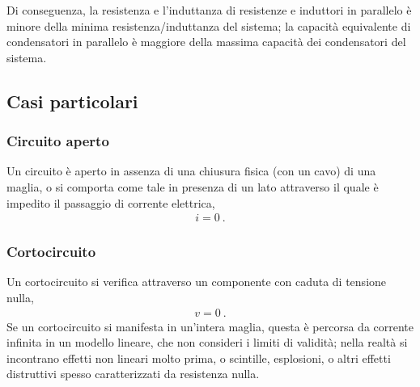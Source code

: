 \documentclass[letterpaper,10pt,italian]{jupyterBook}
\begin{document}
\sphinxAtStartPar
Di conseguenza, la resistenza e l’induttanza di resistenze e induttori in parallelo è minore della minima resistenza/induttanza del sistema; la capacità equivalente di condensatori in parallelo è maggiore della massima capacità dei condensatori del sistema.


\subsection{Casi particolari}
\label{\detokenize{ch/electromagnetism/circuits-electric:casi-particolari}}\label{\detokenize{ch/electromagnetism/circuits-electric:physics-hs-electromagnetism-circuits-electric-circuits}}

\subsubsection{Circuito aperto}
\label{\detokenize{ch/electromagnetism/circuits-electric:circuito-aperto}}\label{\detokenize{ch/electromagnetism/circuits-electric:physics-hs-electromagnetism-circuits-electric-circuits-open}}
\sphinxAtStartPar
Un circuito è aperto in assenza di una chiusura fisica (con un cavo) di una maglia, o si comporta come tale in presenza di un lato attraverso il quale è impedito il passaggio di corrente elettrica,
\begin{equation*}
\begin{split}i = 0 \ .\end{split}
\end{equation*}

\subsubsection{Cortocircuito}
\label{\detokenize{ch/electromagnetism/circuits-electric:cortocircuito}}\label{\detokenize{ch/electromagnetism/circuits-electric:physics-hs-electromagnetism-circuits-electric-circuits-short}}
\sphinxAtStartPar
Un cortocircuito si verifica attraverso un componente con caduta di tensione nulla,
\begin{equation*}
\begin{split}v = 0 \ .\end{split}
\end{equation*}
\sphinxAtStartPar
Se un cortocircuito si manifesta in un’intera maglia, questa è percorsa da corrente infinita \sphinxhyphen{} in un modello lineare, che non consideri i limiti di validità; nella realtà si incontrano effetti non lineari molto prima, o scintille, esplosioni, o altri effetti distruttivi \sphinxhyphen{} spesso caratterizzati da resistenza nulla.  
\end{document}
